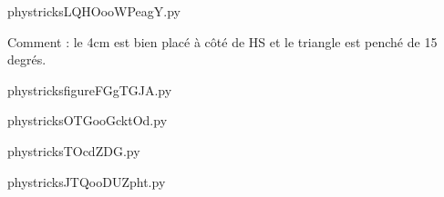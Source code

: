     

    \clearpage
    


    \newcommand{\CaptionFigLQHOooWPeagY}{<+Type your caption here+>}
    \begin{center}
        
    \end{center}
    phystricksLQHOooWPeagY.py

    Comment : le 4cm est bien placé à côté de HS et le triangle est penché de 15 degrés.

    \clearpage
    


    \newcommand{\CaptionFigfigureFGgTGJA}{<+Type your caption here+>}
    \begin{center}
        
    \end{center}
    phystricksfigureFGgTGJA.py

    

    \clearpage
    


    \newcommand{\CaptionFigOTGooGcktOd}{<+Type your caption here+>}
    \begin{center}
        
    \end{center}
    phystricksOTGooGcktOd.py

    

    \clearpage
    


    \newcommand{\CaptionFigTOcdZDG}{<+Type your caption here+>}
    \begin{center}
        
    \end{center}
    phystricksTOcdZDG.py

    

    \clearpage
    


    \newcommand{\CaptionFigJTQooDUZpht}{<+Type your caption here+>}
    \begin{center}
        
    \end{center}
    phystricksJTQooDUZpht.py

    

    \clearpage
    

